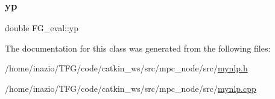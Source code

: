 \mbox{\label{classFG__eval_a8df0b0ddcb354b68551c11a1788a9b6e}} 
\subsubsection{\texorpdfstring{yp}{yp}}
{\footnotesize\ttfamily double F\+G\+\_\+eval\+::yp\hspace{0.3cm}{\ttfamily [private]}}



The documentation for this class was generated from the following files\+:\begin{DoxyCompactItemize}
\item 
/home/inazio/\+T\+F\+G/code/catkin\+\_\+ws/src/mpc\+\_\+node/src/\hyperlink{mynlp_8h}{mynlp.\+h}\item 
/home/inazio/\+T\+F\+G/code/catkin\+\_\+ws/src/mpc\+\_\+node/src/\hyperlink{mynlp_8cpp}{mynlp.\+cpp}\end{DoxyCompactItemize}
